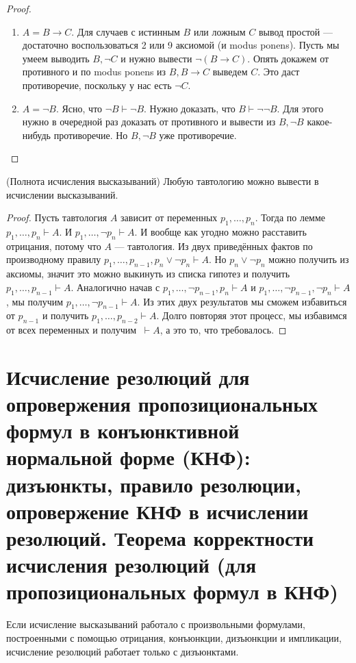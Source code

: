 \documentclass{article}
\begin{document}
\begin{proof}
\begin{enumerate}
		\item \(A = B \to C\). Для случаев с истинным \(B\) или ложным \(C\) вывод простой --- достаточно воспользоваться 2 или 9 аксиомой (и modus ponens). Пусть мы умеем выводить \(B, \lnot C\) и нужно вывести \(\lnot(B \to C)\). Опять докажем от противного и по modus ponens из \(B, B \to C\) выведем \(C\). Это даст противоречие, поскольку у нас есть \(\lnot C\).
		\item \(A = \lnot B\). Ясно, что \(\lnot B \vdash \lnot B\). Нужно доказать, что \(B \vdash \lnot \lnot B\). Для этого нужно в очередной раз доказать от противного и вывести из \(B, \lnot B\) какое-нибудь противоречие. Но \(B, \lnot B\) уже противоречие.
	\end{enumerate}
\end{proof}

\begin{theorem}{(Полнота исчисления высказываний)}
	Любую тавтологию можно вывести в исчислении высказываний.
\end{theorem}

\begin{proof}
	Пусть тавтология \(A\) зависит от переменных \(p_1, \ldots, p_n\). Тогда по лемме \(p_1, \ldots, p_n \vdash A\). И \(p_1, \ldots, \lnot p_n \vdash A\). И вообще как угодно можно расставить отрицания, потому что \(A\) --- тавтология. Из двух приведённых фактов по производному правилу \(p_1, \ldots, p_{n - 1}, p_n \lor \lnot p_n \vdash A\). Но \(p_n \lor \lnot p_n\) можно получить из аксиомы, значит это можно выкинуть из списка гипотез и получить \(p_1, \ldots, p_{n - 1} \vdash A\). Аналогично начав с \(p_1, \ldots, \lnot p_{n - 1}, p_n \vdash A\) и \(p_1, \ldots, \lnot p_{n - 1}, \lnot p_n \vdash A\), мы получим \(p_1, \ldots, \lnot p_{n - 1} \vdash A\). Из этих двух результатов мы сможем избавиться от \(p_{n - 1}\) и получить \(p_1, \ldots, p_{n - 2} \vdash A\). Долго повторяя этот процесс, мы избавимся от всех переменных и получим \(\ \vdash A\), а это то, что требовалось.
\end{proof}

\section{Исчисление резолюций для опровержения пропозициональных формул в конъюнктивной нормальной форме (КНФ): дизъюнкты, правило резолюции, опровержение КНФ в исчислении резолюций. Теорема корректности исчисления резолюций (для пропозициональных формул в КНФ)}
Если исчисление высказываний работало с произвольными формулами, построенными с помощью отрицания, конъюнкции, дизъюнкции и импликации, исчисление резолюций работает только с дизъюнктами.
\end{document}
